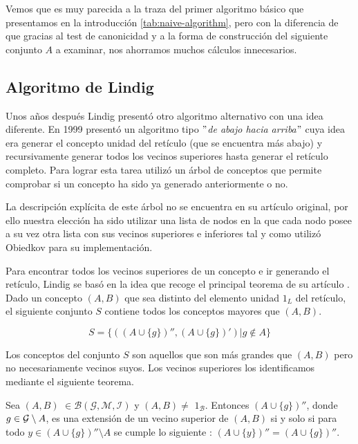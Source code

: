 \documentclass[oneside,openright,titlepage,numbers=noenddot,openany,headinclude,footinclude=true,
cleardoublepage=empty,abstractoff,BCOR=5mm,paper=a4,fontsize=12pt,main=spanish]{scrreprt}
\begin{document}
Vemos que es muy parecida a la traza del primer algoritmo básico que presentamos en la introducción \ref{tab:naive-algorithm}, pero con la diferencia de que gracias al test de canonicidad y a la forma de construcción del siguiente conjunto $A$ a examinar, nos ahorramos muchos cálculos innecesarios.



\subsection{Algoritmo de Lindig}
\label{alg:lindig}

Unos años después Lindig \cite{lindig_concept-based_nodate} presentó otro algoritmo alternativo con una idea diferente. En 1999 presentó un algoritmo tipo $"$\textit{de abajo hacia arriba}$"$ cuya idea era generar el concepto unidad del retículo (que se encuentra más abajo) y recursivamente generar todos los vecinos superiores hasta generar el retículo completo. Para lograr esta tarea utilizó un árbol de conceptos que permite comprobar si un concepto ha sido ya generado anteriormente o no.

La descripción explícita de este árbol no se encuentra en su artículo original, por ello nuestra elección ha sido utilizar una lista de nodos en la que cada nodo posee a su vez otra lista con sus vecinos superiores e inferiores tal y como utilizó Obiedkov \cite{comparingperformance} para su implementación.

Para encontrar todos los vecinos superiores de un concepto e ir generando el retículo, Lindig se basó en la idea que recoge el principal teorema de su artículo \cite{lindig99thesis}. Dado un concepto $(A,B)$ que sea distinto del elemento unidad  \textbf{$1$}$_L$ del retículo, el siguiente conjunto $S$ contiene todos los conceptos mayores que $(A,B)$. 

$$S=\{((A \cup \{g\})'',(A\cup \{g\})') | g \notin A\}$$

Los conceptos del conjunto $S$ son aquellos que son más grandes que $(A,B)$ pero no necesariamente vecinos suyos. Los vecinos superiores los identificamos mediante el siguiente teorema.


\begin{theorem}\label{th:teoremalindig}

Sea $(A,B)$ $\in \mathcal{B}(\mathcal{G},\mathcal{M},\mathcal{I})$ y $(A,B) \neq$ \textbf{$1$}$_\mathcal{B}$. Entonces $(A \cup \{g\})''$, donde $g \in \mathcal{G} \setminus A$, es una extensión de un vecino superior de $(A,B)$ si y solo si para todo $y \in (A \cup \{g\})'' \setminus A$ se cumple lo siguiente : $(A\cup \{y\})''=(A\cup \{g\})''$. 
\end{theorem}
\end{document}
